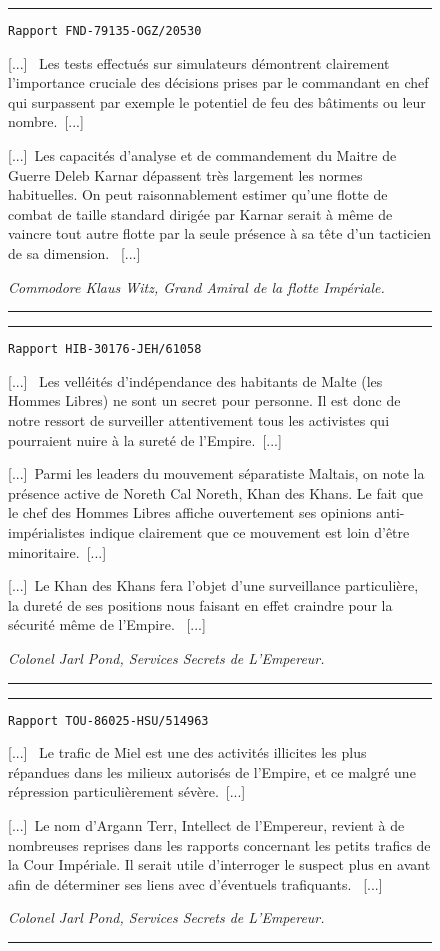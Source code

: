 \documentclass{article}
\newcommand{\indice}[3]{
    \begin{figure}[H]
        \begin{center}
            \rule{0.5\textwidth}{1pt}
        \end{center}
        \begin{framed}
            \begin{samepage}
                \texttt{Rapport #1}
                \nopagebreak

                [...]~#2~[...]

                \nopagebreak
                \hfill\textit{#3}
            \end{samepage}
        \end{framed}
        \caption{}
        \begin{center}
            \rule{0.5\textwidth}{1pt}
        \end{center}
    \end{figure}
}
\begin{document}
\indice
{FND-79135-OGZ/20530}
{
    Les tests effectués sur simulateurs démontrent clairement l'importance
    cruciale des décisions prises par le commandant en chef qui surpassent par
    exemple le potentiel de feu des bâtiments ou leur nombre.~[...]

    \nobreak

    [...]~Les capacités d'analyse et de commandement du Maitre de Guerre Deleb
    Karnar dépassent très largement les normes habituelles. On peut
    raisonnablement estimer qu'une flotte de combat de taille standard dirigée
    par Karnar serait à même de vaincre tout autre flotte par la seule présence
    à sa tête d'un tacticien de sa dimension.
}{Commodore Klaus Witz, Grand Amiral de la flotte Impériale.}

\indice
{HIB-30176-JEH/61058}
{
    Les velléités d'indépendance des habitants de Malte (les \og Hommes
    Libres\fg{}) ne sont un secret pour personne. Il est donc de notre ressort
    de surveiller attentivement tous les activistes qui pourraient nuire à la
    sureté de l'Empire.~[...]

    \nobreak

    [...]~Parmi les leaders du mouvement séparatiste Maltais, on note la
    présence active de Noreth Cal Noreth, Khan des Khans. Le fait que le chef
    des Hommes Libres affiche ouvertement ses opinions anti-impérialistes
    indique clairement que ce mouvement est loin d'être minoritaire.~[...]

    \nobreak

    [...]~Le Khan des Khans fera l'objet d'une surveillance particulière, la
    dureté de ses positions nous faisant en effet craindre pour la sécurité
    même de l'Empire.
}{Colonel Jarl Pond, Services Secrets de L'Empereur.}

\indice
{TOU-86025-HSU/514963}
{
    Le trafic de Miel est une des activités illicites les plus répandues dans
    les milieux autorisés de l'Empire, et ce malgré une répression
    particulièrement sévère.~[...]

    \nobreak

    [...]~Le nom d'Argann Terr, Intellect de l'Empereur, revient à de
    nombreuses reprises dans les rapports concernant les petits trafics de la
    Cour Impériale. Il serait utile d'interroger le suspect plus en avant afin
    de déterminer ses liens avec d'éventuels trafiquants.
}{Colonel Jarl Pond, Services Secrets de L'Empereur.}
\end{document}
